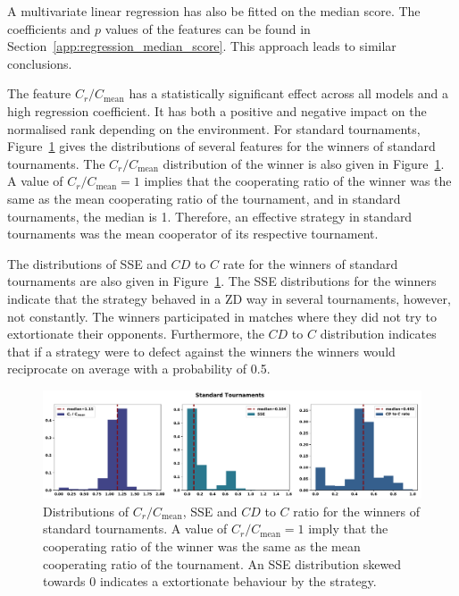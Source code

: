 A multivariate linear regression has also be fitted on the median score. The
coefficients and \(p\) values of the features can be found in
Section~\ref{app:regression_median_score}. This approach leads to similar conclusions.

The feature \(C_{r} / C_{\text{mean}}\) has a statistically significant effect
across all models and a high regression coefficient. It has both a positive and
negative impact on the normalised rank depending on the environment. For
standard tournaments, Figure~\ref{fig:discussion_standard} gives the
distributions of several features for the winners of standard tournaments. The
\(C_{r} / C_{\text{mean}}\) distribution of the winner is also given in
Figure~\ref{fig:discussion_standard}. A value of \(C_r / C_{\text{mean}} = 1\)
implies that the cooperating ratio of the winner was the same as the mean
cooperating ratio of the tournament, and in standard tournaments, the median is
1. Therefore, an effective strategy in standard tournaments was the mean
cooperator of its respective tournament.

The distributions of SSE and \(CD\) to \(C\) rate for the winners of standard
tournaments are also given in Figure~\ref{fig:discussion_standard}. The SSE
distributions for the winners indicate that the strategy behaved in a ZD way in
several tournaments, however, not constantly. The winners participated in
matches where they did not try to extortionate their opponents. Furthermore, the
\(CD\) to \(C\) distribution indicates that if a strategy were to defect against
the winners the winners would reciprocate on average with a probability of 0.5.

\begin{figure}[!htbp]
    \centering
        \centering
        \includegraphics[width=\textwidth]{../images/standard_discussion.pdf}
        \caption{Distributions of \(C_r / C_{\text{mean}}\), SSE and \(CD\) to \(C\) ratio
        for the winners of standard tournaments. A
        value of \(C_r / C_{\text{mean}} = 1\) imply that the cooperating ratio of the
        winner was the same as the mean cooperating ratio of the tournament. An SSE distribution
        skewed towards 0 indicates a extortionate behaviour by the strategy.}
        \label{fig:discussion_standard}
\end{figure}


